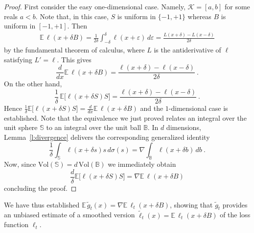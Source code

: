 \documentclass[11pt]{hackednow}
\newcommand{\E}{\mathbb{E}}
\newcommand{\cK}{\mathcal{K}}
\newcommand{\ve}{\varepsilon}
\newcommand{\Ball}{\mathbb{B}}
\newcommand{\Sphere}{\mathbb{S}}
\newcommand{\tloss}{\widetilde{\ell}}
\newcommand{\gtilde}{\widetilde{g}}
\begin{document}
\begin{proof}
First consider the easy one-dimensional case. Namely, $\cK = [a,b]$ for some reals $a < b$. Note that, in this case, $S$ is uniform in $\{-1,+1\}$ whereas $B$ is uniform in $[-1,+1]$. Then
\begin{align*}
    \E\,\ell(x + \delta B)
=
    \frac{1}{2\delta}\int_{-\delta}^{\delta} \ell(x + \ve)\,d\ve
=
    \frac{L(x+\delta) - L(x-\delta)}{2\delta}
\end{align*}
by the fundamental theorem of calculus, where $L$ is the antiderivative of $\ell$ satisfying $L' = \ell$.
This gives
\[
    \frac{d}{dx} \E\,\ell(x + \delta B) = \frac{\ell(x+\delta) - \ell(x-\delta)}{2\delta}~.
\]
On the other hand,
\[
    \frac{1}{\delta}\,\E\bigl[\ell(x + \delta S)S\bigr]
=
    \frac{\ell(x+\delta) - \ell(x-\delta)}{2\delta}~.
\]
Hence $\tfrac{1}{\delta}\E\bigl[\ell(x + \delta S)S\bigr] = \tfrac{d}{dx}\E\,\ell(x + \delta B)$ and the $1$-dimensional case is established. Note that the equivalence we just proved relates an integral over the unit sphere $\Sphere$ to an integral over the unit ball $\Ball$. In $d$ dimensions, Lemma~\ref{l:divergence} delivers the corresponding generalized identity
\[
    \frac{1}{\delta}\int_{\Sphere} \ell(x + \delta s)s\, d\sigma(s)
=
    \nabla\int_{\Ball} \ell(x + \delta b)\, db~.
\]
Now, since $\mathrm{Vol}(\Sphere) = d\,\mathrm{Vol}(\Ball)$ we immediately obtain
\[
    \frac{d}{\delta}\E\bigl[\ell(x + \delta S)S\bigr]
=
    \nabla\E\,\ell(x + \delta B)
\]
concluding the proof.
\end{proof}
We have thus established $\E\,\gtilde_t(x) = \nabla\E\,\ell_t(x + \delta B)$, showing that $\gtilde_t$ provides an unbiased estimate of a smoothed version $\tloss_t(x) = \E\,\ell_t(x + \delta B)$ of the loss function $\ell_t$.
\end{document}
